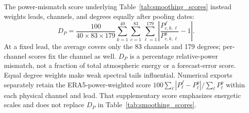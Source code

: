 \documentclass{article}
\newcommand{\vfourred}[1]{{\color{blue}#1}}
\begin{document}
\vfourred{The power-mismatch score underlying Table~\ref{tab:smoothing_scores} instead weights leads, channels, and degrees equally after pooling dates:}
\vfourred{\begin{equation}
D_P=\frac{100}{40\times83\times179}
       \sum_{k=1}^{40}\sum_{c=1}^{83}\sum_{\ell=1}^{179}
       \left|\frac{P^f_{c,k,\ell}}{P^y_{c,k,\ell}}-1\right|.
\label{eq:relative_power_mismatch}
\end{equation}}
\vfourred{At a fixed lead, the average covers only the 83 channels and 179 degrees; per-channel scores fix the channel as well. $D_P$ is a percentage relative-power mismatch, not a fraction of total atmospheric energy or a forecast-error score. Equal degree weights make weak spectral tails influential. Numerical exports separately retain the ERA5-power-weighted score $100\sum_\ell|P^f_\ell-P^y_\ell|/\sum_\ell P^y_\ell$ within each physical channel and lead. That supplementary score emphasizes energetic scales and does not replace $D_P$ in Table~\ref{tab:smoothing_scores}.}

\end{document}
